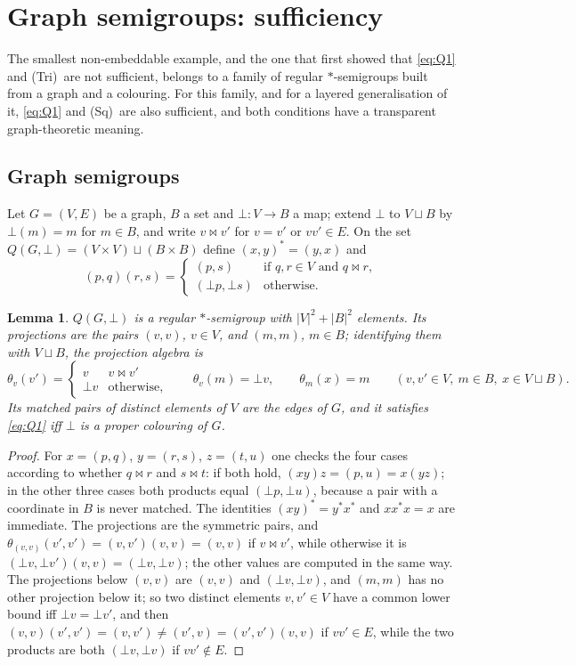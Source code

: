 \documentclass[11pt]{amsart}
\newtheorem{lemma}[theorem]{Lemma}
\theoremstyle{definition}
\newcommand{\mt}{\bowtie}      %
\newcommand{\Tri}{\textup{(Tri)}}
\newcommand{\Wire}{\textup{(Sq)}}      %
\begin{document}
\section{Graph semigroups: sufficiency}\label{sec:graph}

The smallest non-embeddable example, and the one that first showed that \eqref{eq:Q1} and \Tri\ are not sufficient, belongs to a family of regular $*$-semigroups built from a graph and a colouring. For this family, and for a layered generalisation of it, \eqref{eq:Q1} and \Wire\ are also sufficient, and both conditions have a transparent graph-theoretic meaning.

\subsection{Graph semigroups}\label{subsec:graphsg}

Let $G=(V,E)$ be a graph, $B$ a set and $\bot\colon V\to B$ a map; extend $\bot$ to $V\sqcup B$ by $\bot(m)=m$ for $m\in B$, and write $v\mt v'$ for $v=v'$ or $vv'\in E$. On the set $Q(G,\bot)=(V\times V)\sqcup(B\times B)$ define $(x,y)^*=(y,x)$ and
\[
(p,q)(r,s)=\begin{cases}(p,s)&\text{if }q,r\in V\text{ and }q\mt r,\\ (\bot p,\bot s)&\text{otherwise.}\end{cases}
\]

\begin{lemma}\label{lem:graphsg}
$Q(G,\bot)$ is a regular $*$-semigroup with $|V|^2+|B|^2$ elements. Its projections are the pairs $(v,v)$, $v\in V$, and $(m,m)$, $m\in B$; identifying them with $V\sqcup B$, the projection algebra is
\[
\theta_v(v')=\begin{cases}v&v\mt v'\\ \bot v&\text{otherwise,}\end{cases}\qquad \theta_v(m)=\bot v,\qquad \theta_m(x)=m\qquad(v,v'\in V,\ m\in B,\ x\in V\sqcup B).
\]
Its matched pairs of distinct elements of $V$ are the edges of $G$, and it satisfies \eqref{eq:Q1} iff $\bot$ is a proper colouring of $G$.
\end{lemma}

\begin{proof}
For $x=(p,q)$, $y=(r,s)$, $z=(t,u)$ one checks the four cases according to whether $q\mt r$ and $s\mt t$: if both hold, $(xy)z=(p,u)=x(yz)$; in the other three cases both products equal $(\bot p,\bot u)$, because a pair with a coordinate in $B$ is never matched. The identities $(xy)^*=y^*x^*$ and $xx^*x=x$ are immediate. The projections are the symmetric pairs, and $\theta_{(v,v)}(v',v')=(v,v')(v,v)=(v,v)$ if $v\mt v'$, while otherwise it is $(\bot v,\bot v')(v,v)=(\bot v,\bot v)$; the other values are computed in the same way. The projections below $(v,v)$ are $(v,v)$ and $(\bot v,\bot v)$, and $(m,m)$ has no other projection below it; so two distinct elements $v,v'\in V$ have a common lower bound iff $\bot v=\bot v'$, and then $(v,v)(v',v')=(v,v')\ne(v',v)=(v',v')(v,v)$ if $vv'\in E$, while the two products are both $(\bot v,\bot v)$ if $vv'\notin E$.
\end{proof}
\end{document}
